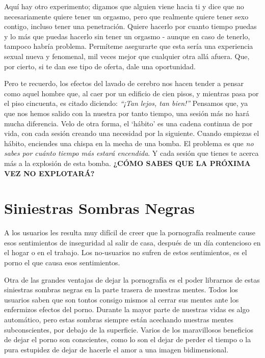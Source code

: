 \documentclass[
]{book}
\begin{document}
Aquí hay otro experimento; digamos que alguien viene hacia ti y dice que no necesariamente quiere tener un orgasmo, pero que realmente quiere tener sexo contigo, incluso tener una penetración. Quiere hacerlo por cuanto tiempo puedas y lo más que puedas hacerlo sin tener un orgasmo - aunque en caso de tenerlo, tampoco habría problema. Permíteme asegurarte que esta sería una experiencia sexual nueva y fenomenal, mil veces mejor que cualquier otra allá afuera. Que, por cierto, si te dan ese tipo de oferta, dale una oportunidad.

Pero te recuerdo, los efectos del lavado de cerebro nos hacen tender a pensar como aquel hombre que, al caer por un edificio de cien pisos, y mientras pasa por el piso cincuenta, es citado diciendo: \emph{``¡Tan lejos, tan bien!''} Pensamos que, ya que nos hemos salido con la nuestra por tanto tiempo, una sesión más no hará mucha diferencia. Velo de otra forma, el `hábito' es una cadena continua de por vida, con cada sesión creando una necesidad por la siguiente. Cuando empiezas el hábito, enciendes una chispa en la mecha de una bomba. El problema es que \emph{no sabes por cuánto tiempo más estará encendida}. Y cada sesión que tienes te acerca más a la explosión de esta bomba. \textbf{¿CÓMO SABES QUE LA PRÓXIMA VEZ NO EXPLOTARÁ?}

\hypertarget{siniestras-sombras-negras}{%
\section{Siniestras Sombras Negras}\label{siniestras-sombras-negras}}

A los usuarios les resulta muy difícil de creer que la pornografía realmente cause esos sentimientos de inseguridad al salir de casa, después de un día contencioso en el hogar o en el trabajo. Los no-usuarios no sufren de estos sentimientos, es el porno el que causa esos sentimientos.

Otra de las grandes ventajas de dejar la pornografía es el poder librarnos de estas siniestras sombras negras en la parte trasera de nuestras mentes. Todos los usuarios saben que son tontos consigo mismos al cerrar sus mentes ante los enfermizos efectos del porno. Durante la mayor parte de nuestras vidas es algo automático, pero estas sombras siempre están acechando nuestras mentes subconscientes, por debajo de la superficie. Varios de los maravillosos beneficios de dejar el porno son conscientes, como lo son el dejar de perder el tiempo o la pura estupidez de dejar de hacerle el amor a una imagen bidimensional.
\end{document}
